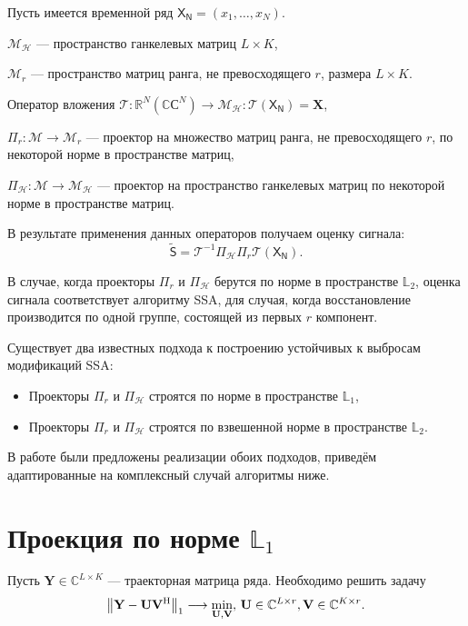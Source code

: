\documentclass[specialist,
               substylefile = spbu.rtx,
               subf,href,colorlinks=true, 12pt]{disser}
\newcommand{\tX}[1]{\mathsf{#1}}
\begin{document}
Пусть имеется временной ряд $\tX{X_N}=(x_1, \ldots, x_{N})$.

$\mathcal{M}_{\mathcal{H}}$ --- пространство ганкелевых матриц $L\times K$,

$\mathcal{M}_{r}$ --- пространство матриц ранга, не превосходящего $r$, размера $L \times K$.

Оператор вложения $\mathcal{T}:\mathbb{R}^N(\mathbb{CС}^N) \rightarrow \mathcal{M}_{\mathcal{H}}: \mathcal{T} (\tX{X_N}) = \mathbf{X} $,

$\Pi_{r}:\mathcal{M}\rightarrow \mathcal{M}_r$ --- проектор на множество матриц ранга, не превосходящего $r$, по некоторой норме в пространстве матриц,

$\Pi_{\mathcal{H}}:\mathcal{M} \rightarrow \mathcal{M}_{\mathcal{H}}$ --- проектор на пространство ганкелевых матриц по некоторой норме в пространстве матриц.

В результате применения данных операторов получаем оценку сигнала:
\begin{equation*}
	\tilde{\tX{S}} = \mathcal{T}^{-1} \Pi_{\mathcal{H}} \Pi_{r} \mathcal{T} (\tX{X_N}).
\end{equation*}

В случае, когда проекторы $\Pi_r$ и $\Pi_{\mathcal{H}}$ берутся по норме в пространстве $\mathbb{L}_2$, оценка сигнала соответствует алгоритму SSA, для случая, когда восстановление производится по одной группе, состоящей из первых $r$ компонент.

Существует два известных подхода к построению устойчивых к выбросам модификаций SSA:

\begin{itemize}
	\item Проекторы $ \Pi_{r}$ и $\Pi_{\mathcal{H}} $ строятся по норме в пространстве $\mathbb{L}_1$,
	\item Проекторы $ \Pi_{r}$ и $\Pi_{\mathcal{H}} $ строятся по взвешенной норме в пространстве $\mathbb{L}_2$.
\end{itemize}

В работе \cite{Tretyakova20} были предложены реализации обоих подходов, приведём адаптированные на комплексный случай алгоритмы ниже. 


\section{Проекция по норме $\mathbb{L}_1$}

Пусть $\mathbf{Y} \in \mathbb{C}^{L\times K}$ --- траекторная матрица ряда.
Необходимо решить задачу
\begin{equation*}
	\norm{\mathbf{Y}-\mathbf{U}\mathbf{V}^{\mathrm{H}}}_1 \longrightarrow \min_{\mathbf{U},\mathbf{V}}, \, \mathbf{U} \in \mathbb{C}^{L\times r}, \mathbf{V} \in \mathbb{C}^{K\times r}.
\end{equation*}
\end{document}
